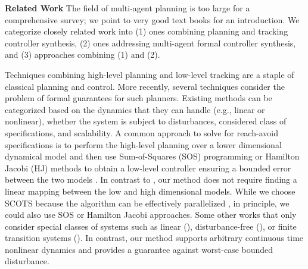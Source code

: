 \smallskip
\noindent\textbf{Related Work}
%
The field of multi-agent planning is too large for a comprehensive survey; we point to very good text books
\cite{LaValle,Kavraki,AIPlanning} for an introduction.
We categorize closely related work into (1) ones combining planning and tracking controller synthesis, 
(2) ones addressing multi-agent formal controller synthesis, and 
(3) approaches combining (1) and (2).

Techniques combining high-level planning and low-level tracking are a staple of classical planning and control. 
More recently, several techniques consider the problem of formal guarantees for such planners.
Existing methods can be categorized based on the dynamics that they can handle (e.g., linear or nonlinear),
whether the system is subject to disturbances, considered class of specifications, and scalability. 
A common approach to solve for reach-avoid specifications is to perform the high-level planning over a lower dimensional dynamical model and then use
Sum-of-Squares (SOS) programming or Hamilton Jacobi (HJ) methods to obtain a low-level controller ensuring a bounded error between the 
two models \cite{herbert2017fastrack,DBLP:journals/corr/abs-1911-09773,singh2018robust}. 
In contrast to \cite{herbert2017fastrack,singh2018robust}, our method does not require finding 
a linear mapping between the low and high dimensional models. 
While we choose SCOTS because the algorithm can be effectively parallelized \cite{KhaledZ19pfaces}, in principle, we could
also use SOS or Hamilton Jacobi approaches.
Some other works that only consider special classes of systems such as linear (\cite{fan2018controller,wongpiromsarn2012receding}), 
disturbance-free (\cite{tedrake2010lqr,fan2020fast}), or finite transition systems (\cite{Yang2017milp}). 
In contrast, our method supports arbitrary continuous time nonlinear dynamics and provides a guarantee 
against worst-case bounded disturbance.
	

